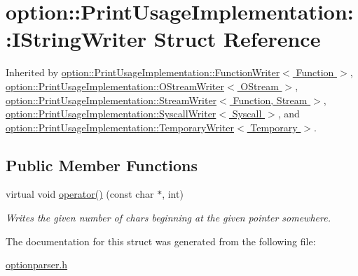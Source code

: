 \hypertarget{structoption_1_1_print_usage_implementation_1_1_i_string_writer}{\section{option\-:\-:\-Print\-Usage\-Implementation\-:\-:\-I\-String\-Writer \-Struct \-Reference}
\label{structoption_1_1_print_usage_implementation_1_1_i_string_writer}
}


\-Inherited by \hyperlink{structoption_1_1_print_usage_implementation_1_1_function_writer}{option\-::\-Print\-Usage\-Implementation\-::\-Function\-Writer$<$ Function $>$}, \hyperlink{structoption_1_1_print_usage_implementation_1_1_o_stream_writer}{option\-::\-Print\-Usage\-Implementation\-::\-O\-Stream\-Writer$<$ O\-Stream $>$}, \hyperlink{structoption_1_1_print_usage_implementation_1_1_stream_writer}{option\-::\-Print\-Usage\-Implementation\-::\-Stream\-Writer$<$ Function, Stream $>$}, \hyperlink{structoption_1_1_print_usage_implementation_1_1_syscall_writer}{option\-::\-Print\-Usage\-Implementation\-::\-Syscall\-Writer$<$ Syscall $>$}, and \hyperlink{structoption_1_1_print_usage_implementation_1_1_temporary_writer}{option\-::\-Print\-Usage\-Implementation\-::\-Temporary\-Writer$<$ Temporary $>$}.

\subsection*{\-Public \-Member \-Functions}
\begin{DoxyCompactItemize}
\item 
\hypertarget{structoption_1_1_print_usage_implementation_1_1_i_string_writer_a497172d92e09072a16996c127dd3def8}{virtual void \hyperlink{structoption_1_1_print_usage_implementation_1_1_i_string_writer_a497172d92e09072a16996c127dd3def8}{operator()} (const char $\ast$, int)}\label{structoption_1_1_print_usage_implementation_1_1_i_string_writer_a497172d92e09072a16996c127dd3def8}

\begin{DoxyCompactList}\small\item\em \-Writes the given number of chars beginning at the given pointer somewhere. \end{DoxyCompactList}\end{DoxyCompactItemize}


\-The documentation for this struct was generated from the following file\-:\begin{DoxyCompactItemize}
\item 
\hyperlink{optionparser_8h}{optionparser.\-h}\end{DoxyCompactItemize}
